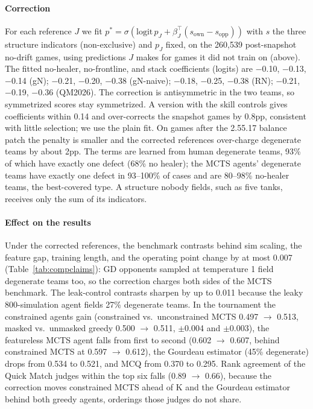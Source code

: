 \documentclass[journal]{IEEEtran}
\begin{document}
\paragraph{Correction} For each reference $J$ we fit $p^\ast = \sigma(\mathrm{logit}\,p_J + \beta_J^\top(s_\text{own} - s_\text{opp}))$ with $s$ the three structure indicators (non-exclusive) and $p_J$ fixed, on the 260,539 post-snapshot no-drift games, using predictions $J$ makes for games it did not train on (above). The fitted no-healer, no-frontline, and stack coefficients (logits) are $-$0.10, $-$0.13, $-$0.14 (gN); $-$0.21, $-$0.20, $-$0.38 (gN-naive); $-$0.18, $-$0.25, $-$0.38 (RN); $-$0.21, $-$0.19, $-$0.36 (QM2026). The correction is antisymmetric in the two teams, so symmetrized scores stay symmetrized. A version with the skill controls gives coefficients within 0.14 and over-corrects the snapshot games by 0.8pp, consistent with little selection; we use the plain fit. On games after the 2.55.17 balance patch the penalty is smaller and the corrected references over-charge degenerate teams by about 2pp. The terms are learned from human degenerate teams, 93\% of which have exactly one defect (68\% no healer); the MCTS agents' degenerate teams have exactly one defect in 93--100\% of cases and are 80--98\% no-healer teams, the best-covered type. A structure nobody fields, such as five tanks, receives only the sum of its indicators.

\paragraph{Effect on the results} Under the corrected references, the benchmark contrasts behind sim scaling, the feature gap, training length, and the operating point change by at most 0.007 (Table~\ref{tab:compclaims}): GD opponents sampled at temperature 1 field degenerate teams too, so the correction charges both sides of the MCTS benchmark. The leak-control contrasts sharpen by up to 0.011 because the leaky 800-simulation agent fields 27\% degenerate teams. In the tournament the constrained agents gain (constrained vs.\ unconstrained MCTS 0.497 $\to$ 0.513, masked vs.\ unmasked greedy 0.500 $\to$ 0.511, $\pm$0.004 and $\pm$0.003), the featureless MCTS agent falls from first to second (0.602 $\to$ 0.607, behind constrained MCTS at 0.597 $\to$ 0.612), the Gourdeau estimator (45\% degenerate) drops from 0.534 to 0.521, and MCQ from 0.370 to 0.295. Rank agreement of the Quick Match judges within the top six falls (0.89 $\to$ 0.66), because the correction moves constrained MCTS ahead of K and the Gourdeau estimator behind both greedy agents, orderings those judges do not share.
\end{document}
